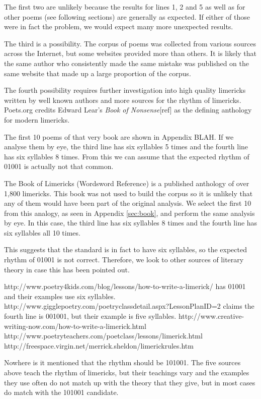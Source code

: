 \begin{description}
The first two are unlikely because the results for lines 1, 2 and 5 as well as for other poems (see following sections) are generally as expected. If either of those were in fact the problem, we would expect many more unexpected results.

The third is a possibility. The corpus of poems was collected from various sources across the Internet, but some websites provided more than others. It is likely that the same author who consistently made the same mistake was published on the same website that made up a large proportion of the corpus.

The fourth possibility requires further investigation into high quality limericks written by well known authors and more sources for the rhythm of limericks. Poets.org credits Edward Lear's \textit{Book of Nonsense}[ref] as the defining anthology for modern limericks.

The first 10 poems of that very book are shown in Appendix BLAH. If we analyse them by eye, the third line has six syllables 5 times and the fourth line has six syllables 8 times. From this we can assume that the expected rhythm of 01001 is actually not that common.

The Book of Limericks (Wordsword Reference) is a published anthology of over 1,800 limericks. This book was not used to build the corpus so it is unlikely that any of them would have been part of the original analysis. We select the first 10 from this analogy, as seen in Appendix \ref{sec:book}, and perform the same analysis by eye. In this case, the third line has six syllables 8 times and the fourth line has six syllables all 10 times.

This suggests that the standard is in fact to have six syllables, so the expected rhythm of 01001 is not correct. Therefore, we look to other sources of literary theory in case this has been pointed out.

http://www.poetry4kids.com/blog/lessons/how-to-write-a-limerick/ has 01001 and their examples use six syllables.
http://www.gigglepoetry.com/poetryclassdetail.aspx?LessonPlanID=2 claims the fourth line is 001001, but their example is five syllables.
http://www.creative-writing-now.com/how-to-write-a-limerick.html
http://www.poetryteachers.com/poetclass/lessons/limerick.html
http://freespace.virgin.net/merrick.sheldon/limerickrules.htm

Nowhere is it mentioned that the rhythm should be 101001. The five sources above teach the rhythm of limericks, but their teachings vary and the examples they use often do not match up with the theory that they give, but in most cases do match with the 101001 candidate.


\end{description}
